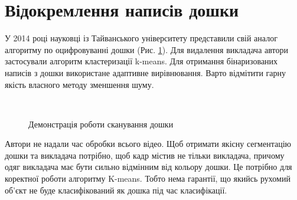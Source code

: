 \section{Відокремлення написів дошки}
У 2014 році науковці із Тайванського університету представили свій аналог \cite{yeh}
алгоритму по оцифровуванні дошки (Рис. \ref{fig:yeh}). Для видалення викладача автори застосували
алгоритм кластеризації k-means. Для отримання бінаризованих написів з дошки
використане адаптивне вирівнювання. Варто відмітити гарну
якість власного методу зменшення шуму.
\begin{figure}[H]
  \centering
  \\
  \caption{Демонстрація роботи сканування дошки \cite{yeh}
    \label{fig:yeh}
  }
\end{figure}
Автори не надали час обробки всього відео. Щоб отримати якісну сегментацію
дошки та викладача потрібно, щоб кадр містив не тільки викладача, причому одяг викладача
має бути сильно відмінним від кольору дошки. Це потрібно для коректної роботи алгоритму K-means.
Тобто нема гарантії, що якийсь рухомий об'єкт не буде класифікований як дошка під час класифікації.

